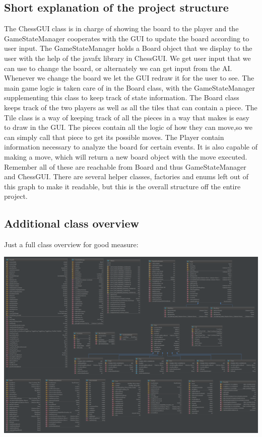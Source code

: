 \documentclass{article}
\begin{document}
    \subsection{Short explanation of the project structure}
    The ChessGUI class is in charge of showing the board to the player and the GameStateManager  
    cooperates with the GUI to update the board according to user input.
	The GameStateManager holds a Board object that we display to the user with the help of the javafx library in ChessGUI.
	We get user input that we can use to change the board, or alternately we can get input from the AI.
	Whenever we change the board we let the GUI redraw it for the user to see.
	The main game logic is taken care of in the Board class, with the GameStateManager supplementing this class to keep track of state information.
	The Board class keeps track of the two players as well as all the tiles that can contain a piece.
	The Tile class is a way of keeping track of all the pieces in a way that makes is easy to draw in the GUI.
	The pieces contain all the logic of how they can move,so we can simply call that piece to get its possible moves.
	The Player contain information necessary to analyze the board for certain events.
	It is also capable of making a move, which will return a new board object with the move executed.
	Remember all of these are reachable from Board and thus GameStateManager and ChessGUI.
    There are several helper classes, factories and enums left out of this graph to make it readable,
    but this is the overall structure off the entire project.

    \vspace{30cm}
    \subsection{Additional class overview}
    Just a full class overview for good measure:
    \begin{center}
    \includegraphics[scale=0.15]{extra-class-overview.png}
    \end{center}
\end{document}
